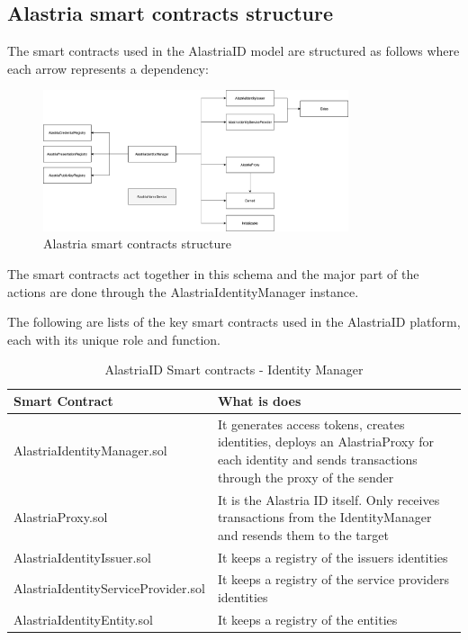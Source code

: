 \documentclass[target=mst,aauheader=]{thud}
\begin{document}
\subsection{Alastria smart contracts structure}

The smart contracts used in the AlastriaID model are structured as follows where each arrow represents a dependency:

\begin{figure}
    \centering
    \includegraphics[width=0.8\textwidth]{images/alastriaSmartContractsStructure.png}
    \caption{Alastria smart contracts structure}
    \label{fig:alastriaSCStructure}
\end{figure}

The smart contracts act together in this schema and the major part of the actions are done through the AlastriaIdentityManager instance.\par
The following are lists of the key smart contracts used in the AlastriaID platform, each with its unique role and function.

\begin{table}[h!]
    \begin{tabular}{|p{6cm}|p{12cm}|}
    \hline
    Smart Contract & What is does\\ [0.5ex] 
    \hline\hline
    AlastriaIdentityManager.sol	 & It generates access tokens, creates identities, deploys an AlastriaProxy for each identity and sends transactions through the proxy of the sender\\ 
    \hline
    AlastriaProxy.sol & It is the Alastria ID itself. Only receives transactions from the IdentityManager and resends them to the target \\ 
    \hline
    AlastriaIdentityIssuer.sol & It keeps a registry of the issuers identities \\
    \hline
    AlastriaIdentityServiceProvider.sol & It keeps a registry of the service providers identities \\
    \hline
    AlastriaIdentityEntity.sol & It keeps a registry of the entities \\
    \hline
    \end{tabular}
    \caption{AlastriaID Smart contracts - Identity Manager}

\end{table}
\end{document}
